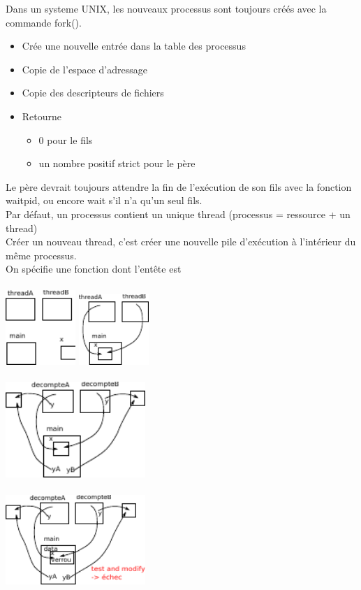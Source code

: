  Dans un systeme UNIX, les nouveaux processus sont toujours créés avec la commande fork(). 
\begin{itemize}
	\item Crée une nouvelle entrée dans la table des processus
	\item Copie de l'espace d'adressage
	\item Copie des descripteurs de fichiers
	\item Retourne
	\begin{itemize}
		\item 0 pour le fils
		\item un nombre positif strict pour le père
	\end{itemize}
\end{itemize}

 Le père devrait toujours attendre la fin de l'exécution de son fils avec la fonction waitpid, ou encore wait s'il n'a qu'un seul fils. \\

 Par défaut, un processus contient un unique thread (processus = ressource + un thread) \\ 
Créer un nouveau thread, c'est créer une nouvelle pile d'exécution à l'intérieur du même processus. \\ 

 On spécifie une fonction dont l'entête est \\

\\
\includegraphics[width=100px]{fig3.pdf}
\includegraphics[width=100px]{fig4.pdf} \\\\
\includegraphics[width=200px]{fig5.pdf} \\\\
\includegraphics[width=200px]{fig6.pdf}

